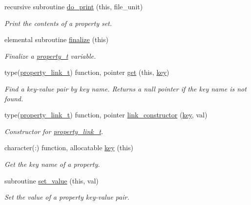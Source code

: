 \begin{DoxyCompactItemize}
recursive subroutine \mbox{\hyperlink{namespacepmc__property_a3f735ac876b8ed0ecd03cc71febb3b66}{do\+\_\+print}} (this, file\+\_\+unit)
\begin{DoxyCompactList}\small\item\em Print the contents of a property set. \end{DoxyCompactList}\item 
elemental subroutine \mbox{\hyperlink{namespacepmc__property_a434f27f2ad31e1c571f3a6cef3473a21}{finalize}} (this)
\begin{DoxyCompactList}\small\item\em Finalize a \mbox{\hyperlink{structpmc__property_1_1property__t}{property\+\_\+t}} variable. \end{DoxyCompactList}\item 
type(\mbox{\hyperlink{structpmc__property_1_1property__link__t}{property\+\_\+link\+\_\+t}}) function, pointer \mbox{\hyperlink{namespacepmc__property_a97d2c3b608eb3421a39442dc9887284e}{get}} (this, \mbox{\hyperlink{namespacepmc__property_a733aef8cbd02fbfed19bde913728678e}{key}})
\begin{DoxyCompactList}\small\item\em Find a key-\/value pair by key name. Returns a null pointer if the key name is not found. \end{DoxyCompactList}\item 
type(\mbox{\hyperlink{structpmc__property_1_1property__link__t}{property\+\_\+link\+\_\+t}}) function, pointer \mbox{\hyperlink{namespacepmc__property_ae7d2bacf90850cee9df295d660cd7e0d}{link\+\_\+constructor}} (\mbox{\hyperlink{namespacepmc__property_a733aef8cbd02fbfed19bde913728678e}{key}}, val)
\begin{DoxyCompactList}\small\item\em Constructor for \mbox{\hyperlink{structpmc__property_1_1property__link__t}{property\+\_\+link\+\_\+t}}. \end{DoxyCompactList}\item 
character(\+:) function, allocatable \mbox{\hyperlink{namespacepmc__property_a733aef8cbd02fbfed19bde913728678e}{key}} (this)
\begin{DoxyCompactList}\small\item\em Get the key name of a property. \end{DoxyCompactList}\item 
subroutine \mbox{\hyperlink{namespacepmc__property_a5833a104f563f288fe180166bc4939b8}{set\+\_\+value}} (this, val)
\begin{DoxyCompactList}\small\item\em Set the value of a property key-\/value pair. \end{DoxyCompactList}\item 

\end{DoxyCompactItemize}
